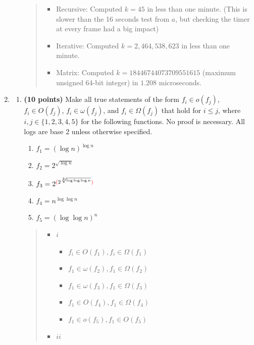 \documentclass[11pt]{article}
\begin{document}
\begin{enumerate}[leftmargin=*]
\begin{enumerate}
\begin{quote}
  \begin{itemize}
    \item Recursive: Computed $k = 45$ in less than one minute. (This is slower than the 16 seconds test from $a$, but checking the timer at every frame had a big impact)
    \item Iterative: Computed $k = 2,464,538,623$ in less than one minute.
    \item Matrix: Computed $k = 18446744073709551615$ (maximum unsigned 64-bit integer) in $1.208$ microseconds.
  \end{itemize}

\end{quote}
\end{enumerate}


\item
\begin{enumerate}
\item
{\bf (10 points)}
Make all true statements of the form $f_i \in o(f_j)$, $f_i \in O(f_j)$, $f_i \in \omega(f_j)$, and $f_i \in \Omega(f_j)$ that hold for $i \le j$, where $i, j \in \{1,2,3,4,5\}$ for the following functions. No proof is necessary. All logs are base 2 unless otherwise specified.
\begin{enumerate}
\item $f_1 = (\log n)^{\log n}$
\item $f_2 = 2^{\sqrt{\log n}}$
\item $f_3 = 2^{{\color{red}(}2^{\sqrt[3]{\log\log\log n}}{\color{red})}}$
\item $f_4 = n^{\log\log n}$
\item $f_5 = (\log\log n)^n$
\end{enumerate}
\begin{quote}
  \color{purple}
  \begin{itemize}
    \item $i$
    \begin{itemize}
      \item $f_i \in O(f_1), f_i \in \Omega(f_1)$ 
      \item $f_1 \in \omega(f_2), f_1 \in \Omega(f_2)$ 
      \item $f_1 \in \omega(f_3), f_1 \in \Omega(f_3)$ 
      \item $f_1 \in O(f_4), f_1 \in \Omega(f_4)$ 
      \item $f_1 \in o(f_5), f_1 \in O(f_5)$ 
    \end{itemize}
    \item $ii$
    \begin{itemize}

\end{itemize}
\end{itemize}
\end{quote}
\end{enumerate}
\end{enumerate}
\end{document}
